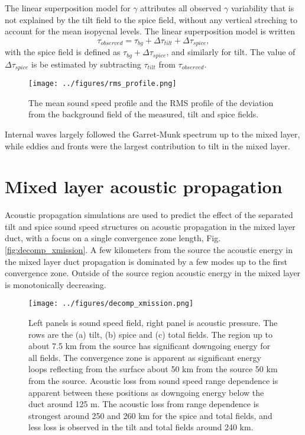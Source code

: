 \documentclass[preprint,NumberedRefs]{JASA}
\begin{document}
The linear superposition model for $\gamma$ attributes all observed $\gamma$ variability that is not explained by the tilt field to the spice field, without any vertical streching to account for the mean isopycnal levels. The linear superposition model is written
\begin{equation}
    \tau_{observed} = \tau_{bg} + \Delta \tau_{tilt} + \Delta \tau_{spice},
\end{equation}
with the spice field is defined as $\tau_{bg} + \Delta \tau_{spice}$, and similarly for tilt. The value of $\Delta \tau_{spice}$ is be estimated by subtracting $\tau_{tilt}$ from $\tau_{observed}$.

\begin{figure}
\texttt{[image: ../figures/rms\_profile.png]}
    \caption{\label{fig:c_rms}{The mean sound speed profile and the RMS profile of the deviation from the background field of the measured, tilt and spice fields. }}
\end{figure}

Internal waves largely followed the Garret-Munk spectrum up to the mixed layer, while eddies and fronts were the largest contribution to tilt in the mixed layer.

\section{\label{sec:propagation}Mixed layer acoustic propagation}
Acoustic propagation simulations are used to predict the effect of the separated tilt and spice sound speed structures on acoustic propagation in the mixed layer duct, with a focus on a single convergence zone length, Fig. \ref{fig:decomp_xmission}. A few kilometers from the source the acoustic energy in the mixed layer duct propagation is dominated by a few modes up to the first convergence zone. Outside of the source region acoustic energy in the mixed layer is monotonically decreasing.

\begin{figure}
\texttt{[image: ../figures/decomp\_xmission.png]}
    \caption{\label{fig:decomp_x}{Left panels is sound speed field, right panel is acoustic pressure. The rows are the (a) tilt, (b) spice and (c) total fields. The region up to about 7.5 km from the source has significant downgoing energy for all fields. The convergence zone is apparent as significant energy loops reflecting from the surface about 50 km from the source 50 km from the source. Acoustic loss from sound speed range dependence is apparent between these positions as downgoing energy below the duct around 125 m. The acoustic loss from range dependence is strongest around 250 and 260 km for the spice and total fields, and less loss is observed in the tilt and total fields around 240 km.}}
\end{figure}
\end{document}
